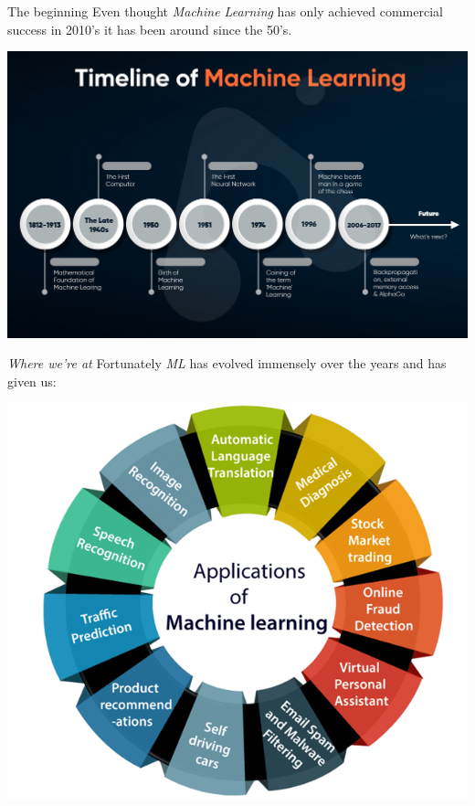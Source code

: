 \documentclass[dvipsnames, handout]{beamer}
\newcommand{\1}{\mathds{1}}	%
\begin{document}
\begin{frame}{The beginning}
Even thought \emph{Machine Learning} has only achieved commercial success in 2010's it has been around since the 50's.
\pause
\begin{center}
\includegraphics[scale=0.15]{presentation/timeline.jpg}
\end{center}
\pause
\end{frame}

\begin{frame}{\emph{Where we're at}}
Fortunately \emph{ML} has evolved immensely over the years and has given us:
\pause
\begin{center}
\includegraphics[scale=0.2]{presentation/ml_now.png}
\end{center}
\pause
\end{frame}
\end{document}
